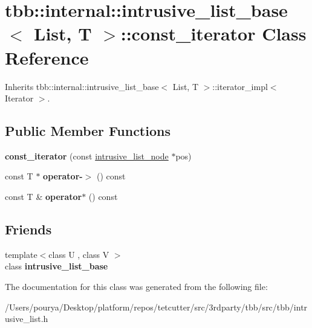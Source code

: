 \hypertarget{classtbb_1_1internal_1_1intrusive__list__base_1_1const__iterator}{}\section{tbb\+:\+:internal\+:\+:intrusive\+\_\+list\+\_\+base$<$ List, T $>$\+:\+:const\+\_\+iterator Class Reference}
\label{classtbb_1_1internal_1_1intrusive__list__base_1_1const__iterator}


Inherits tbb\+::internal\+::intrusive\+\_\+list\+\_\+base$<$ List, T $>$\+::iterator\+\_\+impl$<$ Iterator $>$.

\subsection*{Public Member Functions}
\begin{DoxyCompactItemize}
\item 
\hypertarget{classtbb_1_1internal_1_1intrusive__list__base_1_1const__iterator_a9f9e34f12a4c60ef97d95b2ca9f7d689}{}{\bfseries const\+\_\+iterator} (const \hyperlink{structtbb_1_1internal_1_1intrusive__list__node}{intrusive\+\_\+list\+\_\+node} $\ast$pos)\label{classtbb_1_1internal_1_1intrusive__list__base_1_1const__iterator_a9f9e34f12a4c60ef97d95b2ca9f7d689}

\item 
\hypertarget{classtbb_1_1internal_1_1intrusive__list__base_1_1const__iterator_a4b772bf9d4b6290a741fdbf5758c3ab3}{}const T $\ast$ {\bfseries operator-\/$>$} () const \label{classtbb_1_1internal_1_1intrusive__list__base_1_1const__iterator_a4b772bf9d4b6290a741fdbf5758c3ab3}

\item 
\hypertarget{classtbb_1_1internal_1_1intrusive__list__base_1_1const__iterator_aaf0c5059c7c98f1d157bac2ff1fabb2d}{}const T \& {\bfseries operator$\ast$} () const \label{classtbb_1_1internal_1_1intrusive__list__base_1_1const__iterator_aaf0c5059c7c98f1d157bac2ff1fabb2d}

\end{DoxyCompactItemize}
\subsection*{Friends}
\begin{DoxyCompactItemize}
\item 
\hypertarget{classtbb_1_1internal_1_1intrusive__list__base_1_1const__iterator_a5162ab97d8ee5edd5a81f3f60aaf758c}{}{\footnotesize template$<$class U , class V $>$ }\\class {\bfseries intrusive\+\_\+list\+\_\+base}\label{classtbb_1_1internal_1_1intrusive__list__base_1_1const__iterator_a5162ab97d8ee5edd5a81f3f60aaf758c}

\end{DoxyCompactItemize}


The documentation for this class was generated from the following file\+:\begin{DoxyCompactItemize}
\item 
/\+Users/pourya/\+Desktop/platform/repos/tetcutter/src/3rdparty/tbb/src/tbb/intrusive\+\_\+list.\+h\end{DoxyCompactItemize}
